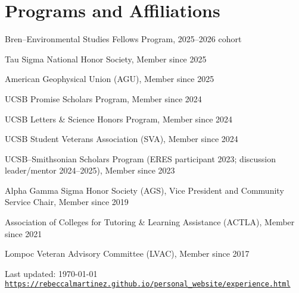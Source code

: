 \documentclass[letterpaper]{article}
\def\footerlink{https://rebeccalmartinez.github.io/personal_website/experience.html}
\renewenvironment{itemize}{
  \begin{list}{}{
    \setlength{\leftmargin}{1.5em}
  }
}{
  \end{list}
}
\begin{document}
\section*{Programs and Affiliations}

\begin{itemize}
\item Bren–Environmental Studies Fellows Program, 2025–2026 cohort
\item Tau Sigma National Honor Society, Member since 2025
\item American Geophysical Union (AGU), Member since 2025
\item UCSB Promise Scholars Program, Member since 2024
\item UCSB Letters \& Science Honors Program, Member since 2024
\item UCSB Student Veterans Association (SVA), Member since 2024
\item UCSB–Smithsonian Scholars Program (ERES participant 2023; discussion leader/mentor 2024–2025), Member since 2023
\item Alpha Gamma Sigma Honor Society (AGS), Vice President and Community Service Chair, Member since 2019
\item Association of Colleges for Tutoring \& Learning Assistance (ACTLA), Member since 2021
\item Lompoc Veteran Advisory Committee (LVAC), Member since 2017
\end{itemize}

 
\bigskip

\begin{center}
  \begin{footnotesize}
    Last updated: \today \\
    \href{\footerlink}{\texttt{\footerlink}}
  \end{footnotesize}
\end{center}
\end{document}
